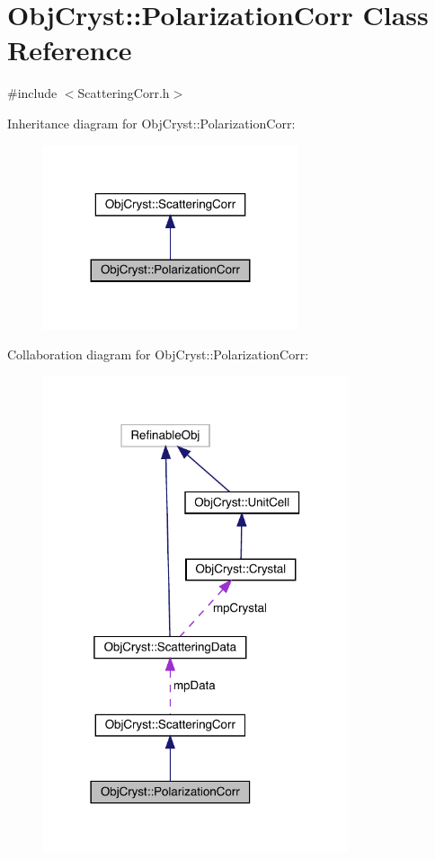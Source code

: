 \hypertarget{class_obj_cryst_1_1_polarization_corr}{}\section{Obj\+Cryst\+::Polarization\+Corr Class Reference}
\label{class_obj_cryst_1_1_polarization_corr}


{\ttfamily \#include $<$Scattering\+Corr.\+h$>$}



Inheritance diagram for Obj\+Cryst\+::Polarization\+Corr\+:
\nopagebreak
\begin{figure}[H]
\begin{center}
\leavevmode
\includegraphics[width=212pt]{class_obj_cryst_1_1_polarization_corr__inherit__graph}
\end{center}
\end{figure}


Collaboration diagram for Obj\+Cryst\+::Polarization\+Corr\+:
\nopagebreak
\begin{figure}[H]
\begin{center}
\leavevmode
\includegraphics[width=254pt]{class_obj_cryst_1_1_polarization_corr__coll__graph}
\end{center}
\end{figure}
